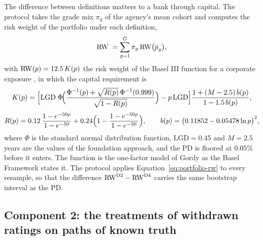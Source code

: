 The difference between definitions matters to a bank through capital. The protocol takes the grade mix $\pi_g$ of the agency's mean cohort and computes the risk weight of the portfolio under each definition,
\begin{equation}
\mathrm{RW}^{\cdot}=\sum_{g=1}^{G}\pi_g\,\mathrm{RW}\bigl(\bar p^{\,\cdot}_g\bigr),
\label{eq:portfolio-rw}
\end{equation}
with $\mathrm{RW}(p)=12.5\,K(p)$ the risk weight of the Basel III function for a corporate exposure \citep{BCBS_CRE31}, in which the capital requirement is
\begin{equation}
K(p)=\Bigl[\mathrm{LGD}\;\Phi\!\Bigl(\frac{\Phi^{-1}(p)+\sqrt{R(p)}\,\Phi^{-1}(0.999)}{\sqrt{1-R(p)}}\Bigr)-p\,\mathrm{LGD}\Bigr]\frac{1+(M - 2.5)\,b(p)}{1-1.5\,b(p)},
\label{eq:irb-k}
\end{equation}
\begin{equation}
R(p)=0.12\,\frac{1-e^{-50p}}{1-e^{-50}}+0.24\Bigl(1-\frac{1-e^{-50p}}{1-e^{-50}}\Bigr),\qquad
b(p)=\bigl(0.11852-0.05478\ln p\bigr)^{2},
\label{eq:irb-r}
\end{equation}
where $\Phi$ is the standard normal distribution function, $\mathrm{LGD}=0.45$ and $M=2.5$ years are the values of the foundation approach, and the PD is floored at $0.05\%$ before it enters. The function is the one-factor model of Gordy \citep{Gordy_2003} as the Basel Framework states it. The protocol applies Equation~\eqref{eq:portfolio-rw} to every resample, so that the difference $\mathrm{RW}^{\mathrm{D2}}-\mathrm{RW}^{\mathrm{D4}}$ carries the same bootstrap interval as the PD.

\subsection{Component 2: the treatments of withdrawn ratings on paths of known truth} %
\label{sec:method-withdrawals}

